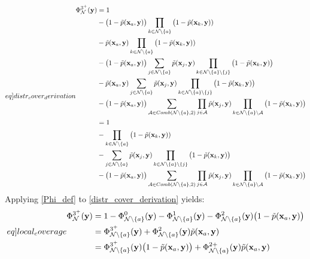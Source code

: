 \begin{equation}\label[eq]{distr_cover_derivation}
  \begin{split}
    \Phi^{3^{+}}_{\mathcal{N}}(\mathbf{y}) &= 1\\
    &- \big(1-\tilde{p}(\mathbf{x}_{a}, \mathbf{y})\big)\prod_{k\in\mathcal{N}\setminus\{a\}}\big(1-\tilde{p}(\mathbf{x}_{k}, \mathbf{y}))\\
    &- \tilde{p}(\mathbf{x}_{a}, \mathbf{y})\prod_{k\in\mathcal{N}\setminus\{a\}}\big(1-\tilde{p}(\mathbf{x}_{k}, \mathbf{y}))\\
    &- \big(1-\tilde{p}(\mathbf{x}_{a}, \mathbf{y})\big)\sum_{j\in\mathcal{N}\setminus\{a\}}\tilde{p}(\mathbf{x}_{j}, \mathbf{y})\prod_{k\in\mathcal{N}\setminus\{a\}\setminus\{j\}}\big(1-\tilde{p}(\mathbf{x}_{k}, \mathbf{y})\big)\\
    &- \tilde{p}(\mathbf{x}_{a}, \mathbf{y})\sum_{j\in \mathcal{N}\setminus\{a\}}\tilde{p}(\mathbf{x}_{j}, \mathbf{y})\prod_{k\in\mathcal{N}\setminus\{a\}\setminus\{j\}}\big(1-\tilde{p}(\mathbf{x}_{k}, \mathbf{y})\big)\\
    &- \big(1-\tilde{p}(\mathbf{x}_{a}, \mathbf{y})\big)\sum_{\mathcal{A}\in Comb(\mathcal{N}\setminus\{a\}, 2)}\prod_{j\in\mathcal{A}}\tilde{p}(\mathbf{x}_{j}, \mathbf{y})\prod_{k\in\mathcal{N}\setminus\{a\}\setminus\mathcal{A}}\big(1-\tilde{p}(\mathbf{x}_{k}, \mathbf{y})\big)\\
    &= 1\\
    &- \prod_{k\in\mathcal{N}\setminus\{a\}}\big(1-\tilde{p}(\mathbf{x}_{k}, \mathbf{y}))\\
    &- \sum_{j\in\mathcal{N}\setminus\{a\}}\tilde{p}(\mathbf{x}_{j}, \mathbf{y})\prod_{k\in\mathcal{N}\setminus\{a\}\setminus\{j\}}\big(1-\tilde{p}(\mathbf{x}_{k}, \mathbf{y})\big)\\
    &- \big(1-\tilde{p}(\mathbf{x}_{a}, \mathbf{y})\big)\sum_{\mathcal{A}\in Comb(\mathcal{N}\setminus\{a\}, 2)}\prod_{j\in\mathcal{A}}\tilde{p}(\mathbf{x}_{j}, \mathbf{y})\prod_{k\in\mathcal{N}\setminus\{a\}\setminus\mathcal{A}}\big(1-\tilde{p}(\mathbf{x}_{k}, \mathbf{y})\big)\\
  \end{split}
\end{equation}
Applying \eqref{Phi_def} to \eqref{distr_cover_derivation} yields:
\begin{equation}\label[eq]{local_coverage}
  \begin{split}
    \Phi^{3^{+}}_{\mathcal{N}}(\mathbf{y}) &= 1 - \Phi^{0}_{\mathcal{N}\setminus\{a\}}(\mathbf{y}) - \Phi^{1}_{\mathcal{N}\setminus\{a\}}(\mathbf{y}) - \Phi^{2}_{\mathcal{N}\setminus\{a\}}(\mathbf{y})\big(1-\tilde{p}(\mathbf{x}_{a}, \mathbf{y})\big)\\
    &= \Phi^{3^{+}}_{\mathcal{N}\setminus\{a\}}(\mathbf{y}) + \Phi^{2}_{\mathcal{N}\setminus\{a\}}(\mathbf{y})\tilde{p}(\mathbf{x}_{a}, \mathbf{y})\\
    &= \Phi^{3^{+}}_{\mathcal{N}\setminus\{a\}}(\mathbf{y})\big(1-\tilde{p}(\mathbf{x}_{a}, \mathbf{y})\big) + \Phi^{2+}_{\mathcal{N}\setminus\{a\}}(\mathbf{y})\tilde{p}(\mathbf{x}_{a}, \mathbf{y})\\
  \end{split}
\end{equation}
